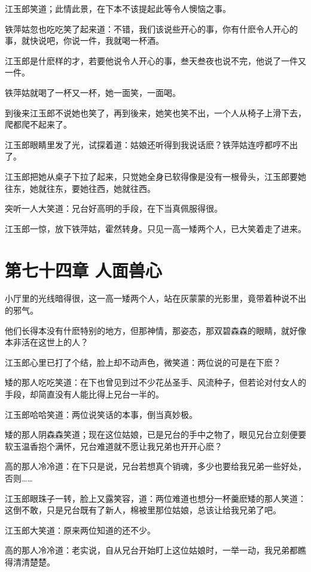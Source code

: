 \documentclass[12pt,oneside]{book}
\begin{document}
江玉郎笑道；此情此景，在下本不该提起此等令人懊恼之事。

铁萍姑忽也吃吃笑了起来道：不错，我们该说些开心的事，你有什麽令人开心的事，就快说吧，你说一件，我就喝一杯酒。

江玉郎是什麽样的才，若要他说令人开心的事，叁天叁夜也说不完，他说了一件又一件。

铁萍姑就喝了一杯又一杯，她一面笑，一面喝。

到後来江玉郎不说她也笑了，再到後来，她笑也笑不出，一个人从椅子上滑下去，爬都爬不起来了。

江玉郎眼睛里发了光，试探着道：姑娘还听得到我说话麽？铁萍姑连哼都哼不出了。

江玉郎把她从桌子下拉了起来，只觉她全身已软得像是没有一根骨头，江玉郎要她往东，她就往东，要她往西，她就往西。

突听一人大笑道：兄台好高明的手段，在下当真佩服得很。

江玉郎一惊，放下铁萍姑，霍然转身。只见一高一矮两个人，已大笑着走了进来。

\hypertarget{ux7b2cux4e03ux5341ux56dbux7ae0-ux4ebaux9762ux517dux5fc3}{%
\chapter{第七十四章
人面兽心}\label{ux7b2cux4e03ux5341ux56dbux7ae0-ux4ebaux9762ux517dux5fc3}}

小厅里的光线暗得很，这一高一矮两个人，站在灰蒙蒙的光影里，竟带着种说不出的邪气。

他们长得本没有什麽特别的地方，但那神情，那姿态，那双碧森森的眼睛，就好像本非活在这世上的人？

江玉郎心里已打了个结，脸上却不动声色，微笑道：两位说的可是在下麽？

矮的那人吃吃笑道：在下也曾见到过不少花丛圣手、风流种子，但若论对付女人的手段，却简直没有人能比得上兄台一半的。

江玉郎哈哈笑道：两位说笑话的本事，倒当真妙极。

矮的那人阴森森笑道；现在这位姑娘，已是兄台的手中之物了，眼见兄台立刻便要软玉温香抱个满怀，兄台难道就不愿让我兄弟也开开心麽？

高的那人冷冷道：在下只是说，兄台若想真个销魂，多少也要给我兄弟一些好处，否则\ldots\ldots{}

江玉郎眼珠子一转，脸上又露笑容，道：两位难道也想分一杯羹麽矮的那人笑道：这倒不敢，只是兄台既有了新人，棉被里那位姑娘，总该让给我兄弟了吧。

江玉郎大笑道：原来两位知道的还不少。

高的那人冷冷道：老实说，自从兄台开始盯上这位姑娘时，一举一动，我兄弟都瞧得清清楚楚。
\end{document}

